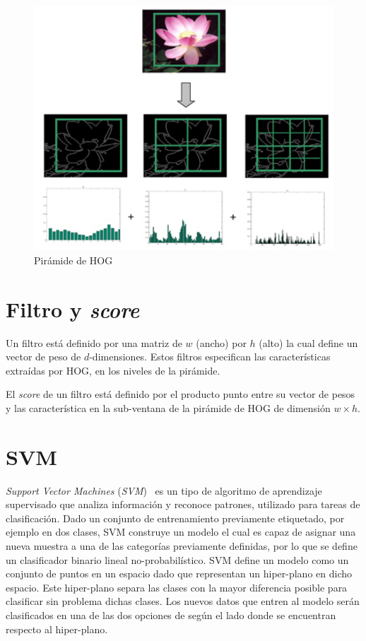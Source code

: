 \begin{figure}[tb]
  \centering
   \includegraphics[width=1\textwidth]{Figuras/phog.jpg}
   \caption{Pirámide de HOG~\cite{pyra}}
   \label{fig:hog_pyra}
\end{figure}

\section{Filtro y \textit{score}}\label{sec:fas}

Un filtro está definido por una matriz de $w$ (ancho) por $h$ (alto) la cual define un vector de peso de $d$-dimensiones. Estos filtros especifican las características extraídas por HOG, en los niveles de la pirámide.

El \textit{score} de un filtro está definido por el producto punto entre su vector de pesos y las característica en la sub-ventana de la pirámide de HOG de dimensión $w \times h$.
\section{SVM}\label{sec:lsvm}

\textit{Support Vector Machines} (\textit{SVM})~\cite{Vapnik1995, Duda2000, Cortes1995} es un tipo de algoritmo de aprendizaje supervisado que analiza información y reconoce patrones, utilizado para tareas de clasificación. Dado un conjunto de entrenamiento previamente etiquetado, por ejemplo en dos clases, SVM construye un modelo el cual es capaz de asignar una nueva muestra a una de las categorías previamente definidas, por lo que se define un clasificador binario lineal no-probabilístico.
SVM define un modelo como un conjunto de puntos en un espacio dado que representan un hiper-plano en dicho espacio. Este hiper-plano separa las clases con la mayor diferencia posible para clasificar sin problema dichas clases. Los nuevos datos que entren al modelo serán clasificados en una de las dos opciones de según el lado donde se encuentran respecto al hiper-plano.

